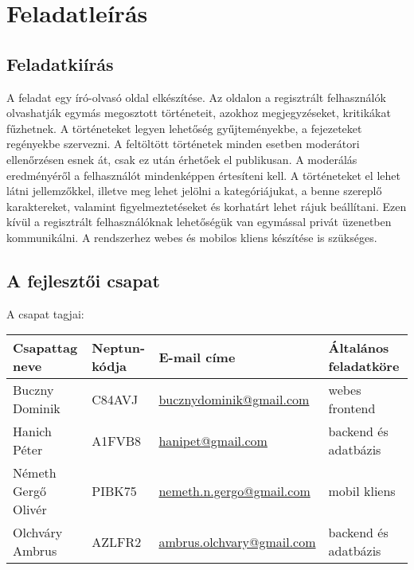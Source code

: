 \section{Feladatleírás}

\subsection{Feladatkiírás}

A feladat egy író-olvasó oldal elkészítése. Az oldalon a regisztrált felhasználók olvashatják egymás megosztott történeteit, azokhoz megjegyzéseket, kritikákat fűzhetnek. A történeteket legyen lehetőség gyűjteményekbe, a fejezeteket regényekbe szervezni. A feltöltött történetek minden esetben moderátori ellenőrzésen esnek át, csak ez után érhetőek el publikusan. A moderálás eredményéről a felhasználót mindenképpen értesíteni kell. A történeteket el lehet látni jellemzőkkel, illetve meg lehet jelölni a kategóriájukat, a benne szereplő karaktereket, valamint figyelmeztetéseket és korhatárt lehet rájuk beállítani. Ezen kívül a regisztrált felhasználóknak lehetőségük van egymással privát üzenetben kommunikálni. A rendszerhez webes és mobilos kliens készítése is szükséges.

\subsection{A fejlesztői csapat}
A csapat tagjai:
\begin{table}[h]
    \begin{tabular}{ |l|l|l|l| }
        \hline
        \textbf{Csapattag neve} & \textbf{Neptun-kódja} & \textbf{E-mail címe}
        & \textbf{Általános feladatköre} \\
        \hline\hline
        Buczny Dominik & C84AVJ & \href{mailto:bucznydominik@gmail.com}{bucznydominik@gmail.com}
        & webes frontend \\
        \hline
        Hanich Péter & A1FVB8 & \href{mailto:hanipet@gmail.com}{hanipet@gmail.com}
        & backend és adatbázis \\ %
        \hline
        Németh Gergő Olivér & PIBK75 & \href{mailto:nemeth.n.gergo@gmail.com}{nemeth.n.gergo@gmail.com}
        & mobil kliens \\ %
        \hline
        Olchváry Ambrus & AZLFR2 & \href{mailto:ambrus.olchvary@gmail.com}{ambrus.olchvary@gmail.com} & backend és adatbázis \\ %
        \hline
    \end{tabular}
\end{table}

